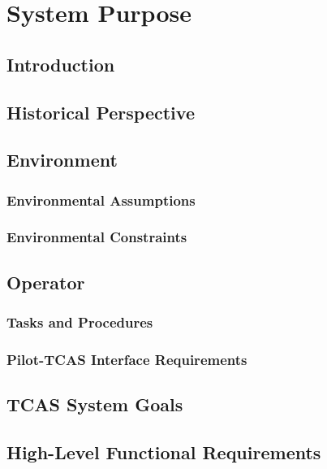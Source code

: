 \documentclass[12pt]{report}
\begin{document}
%
%
%

\tableofcontents

\chapter{System Purpose}
\section{Introduction}
\section{Historical Perspective}
\section{Environment}
\subsection{Environmental Assumptions}
\subsection{Environmental Constraints}
\section{Operator}
\subsection{Tasks and Procedures}
\subsection{Pilot-TCAS Interface Requirements}
\section{TCAS System Goals}
\section{High-Level Functional Requirements}
\end{document}
